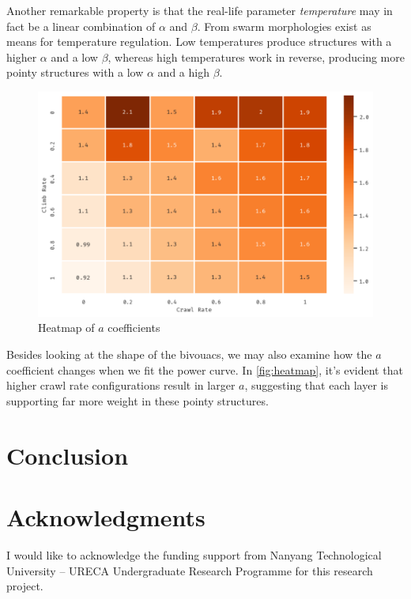 \documentclass[a4paper,10pt]{article}
\begin{document}
\begin{multicols}{2}
    Another remarkable property is that the real-life parameter \textit{temperature}
    may in fact be a linear combination of $\alpha$ and $\beta$. From \cite{heinrich1981mechanisms}
    swarm morphologies exist as means for temperature regulation. Low temperatures
    produce structures with a higher $\alpha$ and a low $\beta$, whereas high temperatures
    work in reverse, producing more pointy structures with a low $\alpha$ and a high $\beta$.

    \begin{figure}[H]
        \centering
        \includegraphics[width=\linewidth]{heatmap.pdf}
        \caption{Heatmap of $a$ coefficients}
        \label{fig:heatmap}
    \end{figure}

    Besides looking at the shape of the bivouacs, we may also examine how the $a$
    coefficient changes when we fit the power curve. In \autoref{fig:heatmap}, it's evident
    that higher crawl rate configurations result in larger $a$, suggesting that each layer
    is supporting far more weight in these pointy structures.

    \section{Conclusion}

    \section*{Acknowledgments}

    I would like to acknowledge the funding support from Nanyang Technological University – URECA Undergraduate Research Programme for this research project.


\end{multicols}
\end{document}
